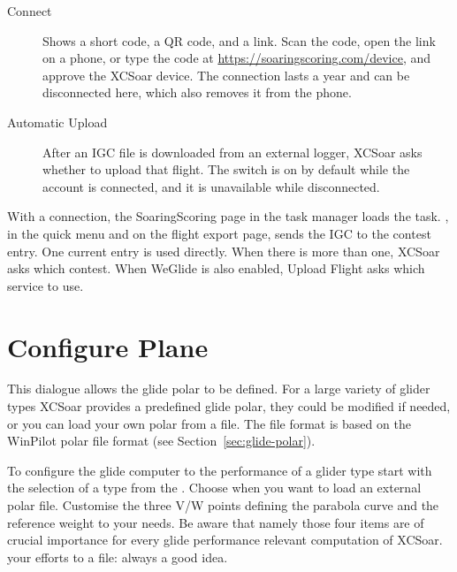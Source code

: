 \begin{description}
\item[Connect]  Shows a short code, a QR code, and a link. Scan the
  code, open the link on a phone, or type the code at
  \url{https://soaringscoring.com/device}, and approve the XCSoar
  device. The connection lasts a year and can be
  disconnected here, which also removes it from the phone.
\item[Automatic Upload]  After an IGC file is downloaded from an
  external logger, XCSoar asks whether to upload that flight.
  The switch is on by default while the account is connected, and it
  is unavailable while disconnected.
\end{description}

With a connection, the SoaringScoring page in the task manager loads
the task. , in the quick menu and on the flight
export page, sends the IGC to the contest entry. One current entry is
used directly. When there is more than one, XCSoar asks which contest.
When WeGlide is also enabled, Upload Flight asks which service to use.

\section{Configure Plane}

This dialogue allows the glide polar to be defined. For a large variety of glider
types XCSoar provides a predefined glide polar, they could be modified if 
needed, or you can load your own polar from a file. 
The file format is based on the WinPilot polar file format (see Section~\ref{sec:glide-polar}).

\label{conf:polar} To configure the glide computer to the performance of a glider 
type start with the selection of a type from the . 
Choose  when you want to load an external polar file.
Customise the three V/W points defining the parabola curve and the reference
weight to your needs. 
\tip Be aware that namely those four items are of crucial importance 
for every glide performance relevant computation of XCSoar.   
 your efforts to a file: always a good idea.

